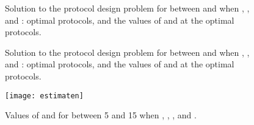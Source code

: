 \documentclass[12pt,draftclsnofoot,onecolumn]{IEEEtran}
\begin{document}
\begin{figure}\centering
{}\caption{Solution to the protocol design problem
for  between  and  when , , and :
\protect{} optimal protocols, and
\protect{} the values of  and  at the optimal protocols.}
\label{fig:nunc}\end{figure}

\begin{figure}\centering
{}\caption{Solution to the protocol design problem
for  between  and  when , , and :
\protect{} optimal protocols, and
\protect{} the values of  and  at the optimal protocols.}
\label{fig:tunc}\end{figure}

\begin{figure}\centering
\texttt{[image: estimaten]}
\caption{Values of  and 
for  between 5 and 15
when , , , and .}
\label{fig:esti}\end{figure}
\end{document}
